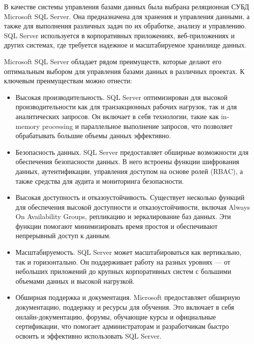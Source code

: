 В качестве системы управления базами данных была выбрана реляционная СУБД Microsoft SQL Server. Она предназначена для хранения и управления данными, а также для выполнения различных задач по их обработке, анализу и управлению. SQL Server используется в корпоративных приложениях, веб-приложениях и других системах, где требуется надежное и масштабируемое хранилище данных.

Microsoft SQL Server обладает рядом преимуществ, которые делают его оптимальным выбором для управления базами данных в различных проектах. К ключевым преимуществам можно отнести:
\begin{itemize}
	\item Высокая производительность. SQL Server оптимизирован для высокой производительности как для транзакционных рабочих нагрузок, так и для аналитических запросов. Он включает в себя технологии, такие как in-memory processing и параллельное выполнение запросов, что позволяет обрабатывать большие объемы данных эффективно.
	\item Безопасность данных. SQL Server предоставляет обширные возможности для обеспечения безопасности данных. В него встроены функции шифрования данных, аутентификации, управления доступом на основе ролей (RBAC), а также средства для аудита и мониторинга безопасности.
	\item Высокая доступность и отказоустойчивость. Существует несколько функций для обеспечения высокой доступности и отказоустойчивости, включая Always On Availability Groups, репликацию и зеркалирование баз данных. Эти функции помогают минимизировать время простоя и обеспечивают непрерывный доступ к данным.
	\item Масштабируемость. SQL Server может масштабироваться как вертикально, так и горизонтально. Он поддерживает работу на разных уровнях — от небольших приложений до крупных корпоративных систем с большими объемами данных и высокой нагрузкой.
	\item Обширная поддержка и документация. Microsoft предоставляет обширную документацию, поддержку и ресурсы для обучения. Это включает в себя онлайн-документацию, форумы, обучающие курсы и официальные сертификации, что помогает администраторам и разработчикам быстро освоить и эффективно использовать SQL Server.
\end{itemize}


